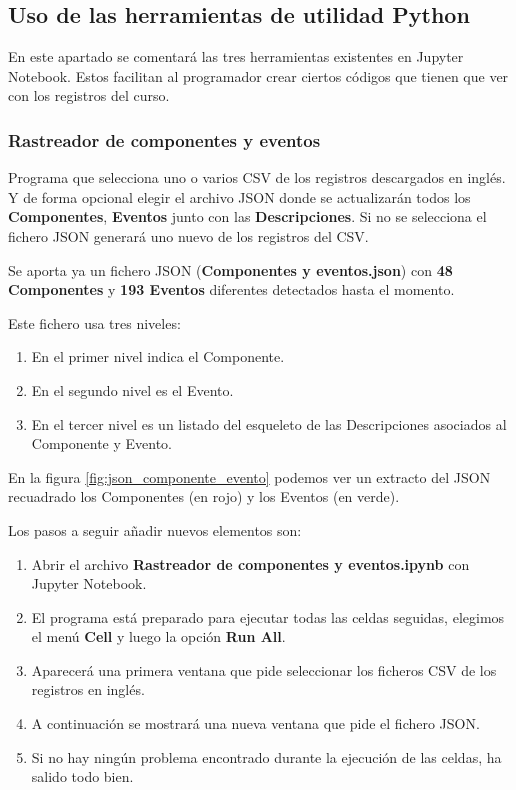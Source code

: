 \subsection{Uso de las herramientas de utilidad Python}

En este apartado se comentará las tres herramientas existentes en Jupyter Notebook. Estos facilitan al programador crear ciertos códigos que tienen que ver con los registros del curso.

\subsubsection{Rastreador de componentes y eventos} \label{rastreador_componentes_eventos}

Programa que selecciona uno o varios CSV de los registros descargados en inglés. Y de forma opcional elegir el archivo JSON donde se actualizarán todos los \textbf{Componentes}, \textbf{Eventos} junto con las \textbf{Descripciones}. Si no se selecciona el fichero JSON generará uno nuevo de los registros del CSV.

Se aporta ya un fichero JSON (\textbf{Componentes y eventos.json}) con \textbf{48 Componentes} y \textbf{193 Eventos} diferentes detectados hasta el momento. 

Este fichero usa tres niveles:
\begin{enumerate}
	\item En el primer nivel indica el Componente.
	\item En el segundo nivel es el Evento.
	\item En el tercer nivel es un listado del esqueleto de las Descripciones asociados al Componente y Evento.
\end{enumerate}

En la figura \ref{fig:json_componente_evento} podemos ver un extracto del JSON recuadrado los Componentes (en rojo) y los Eventos (en verde).


Los pasos a seguir añadir nuevos elementos son:

\begin{enumerate}
	\item Abrir el archivo \textbf{Rastreador de componentes y eventos.ipynb} con Jupyter Notebook.
	\item El programa está preparado para ejecutar todas las celdas seguidas, elegimos el menú \textbf{Cell} y luego la opción \textbf{Run All}.
	\item Aparecerá una primera ventana que pide seleccionar los ficheros CSV de los registros en inglés.
	\item A continuación se mostrará una nueva ventana que pide el fichero JSON.
	\item Si no hay ningún problema encontrado durante la ejecución de las celdas, ha salido todo bien. 
\end{enumerate}


